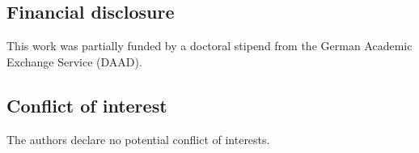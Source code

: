 \documentclass[AMA,LATO1COL]{WileyNJD-v2}
\begin{document}
\subsection*{Financial disclosure}
This work was partially funded by a doctoral stipend from the German Academic Exchange Service (DAAD).

\subsection*{Conflict of interest}
The authors declare no potential conflict of interests.

% 



\end{document}
